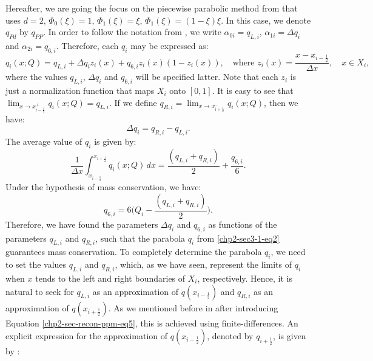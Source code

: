 Hereafter, we are going the focus on the piecewise parabolic method from \citet{colella:1984} that uses $d=2$, 
$\Phi_0(\xi)=1$, $\Phi_1(\xi)=\xi$, $\Phi_1(\xi)=(1-\xi)\xi$. 
In this case, we denote $q_{Pd}$ by $q_{PP}$.
In order to follow the notation from \citet{colella:1984},
we write $\alpha_{0i} = q_{L, i}$, $\alpha_{1i} = \Delta q_i$ and $\alpha_{2i} = q_{6, i}$.
Therefore, each $q_i$ may be expressed as:
\begin{equation}
	\label{chp2-sec-recon-ppm-eq1}
	q_i(x;Q) = q_{L, i} + \Delta q_i z_i(x) + q_{6, i}z_i(x)(1-z_i(x)), 
	\quad \text{where }
	z_i(x) = \frac{x-x_{i-\frac{1}{2}}}{\Delta x},
	\quad x \in X_i,
\end{equation}
where the values $q_{L, i}$, $\Delta q_i$ and $q_{6, i}$  will be specified latter.
Note that each $z_i$ is just a normalization function that maps $X_i$ onto $[0,1]$.
It is easy to see that 
$\lim_{x \to x_{i-\frac{1}{2}}^+} {q_i(x;Q)} = q_{L, i}$.
If we define $q_{R, i} = \lim_{x \to x_{i+\frac{1}{2}}^-} {q_i(x;Q)}$,
then we have:
\begin{equation}
	\label{chp2-sec-recon-ppm-eq2}
	\Delta q_i = q_{R, i} - q_{L, i}.
\end{equation}
The average value of $q_i$ is given by:
\begin{equation}
	\label{chp2-sec-recon-ppm-eq3}
	\frac{1}{\Delta x}\int_{x_{i-\frac{1}{2}}}^{x_{i+\frac{1}{2}}} {q}_i(x;Q) \,dx
	= \frac{(q_{L,i} + q_{R,i})}{2} + \frac{q_{6,i}}{6}.
\end{equation}
Under the hypothesis of mass conservation, we have:
\begin{equation}
	\label{chp2-sec-recon-ppm-eq4}
	q_{6,i} = 6\bigg(Q_i - \frac{(q_{L,i} + q_{R,i})}{2}\bigg).
\end{equation}
Therefore, we have found the parameters $\Delta q_i$ and $q_{6, i}$ as
functions of the parameters $q_{L, i}$ and $q_{R, i}$,
such that the parabola $q_i$ from \eqref{chp2-sec3-1-eq2} 
guarantees mass conservation. To completely determine the 
parabola $q_i$, we need to set the values $q_{L, i}$ and
$q_{R, i}$, which, as we have seen, represent the limits of $q_i$ when
$x$ tends to the left and right boundaries of $X_i$, respectively.
Hence, it is natural to seek for $q_{L, i}$ as an approximation of $q(x_{i-\frac{1}{2}})$
and $q_{R, i}$ as an approximation of $q(x_{i+\frac{1}{2}})$.
As we mentioned before in after introducing Equation \eqref{chp2-sec-recon-ppm-eq5}, this is achieved
using finite-differences.
An explicit expression for the approximation of $q(x_{i-\frac{1}{2}})$, denoted by $q_{i+\frac{1}{2}}$, is given by \citep{colella:1984}:
